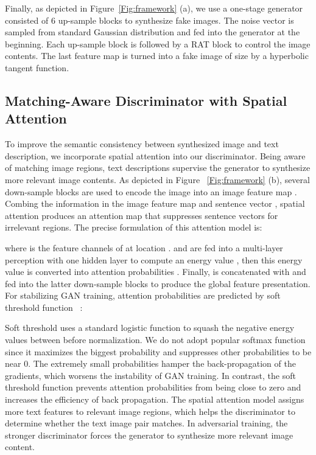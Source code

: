 \documentclass{article}
\begin{document}
Finally, as depicted in Figure~\ref{Fig:framework} (a), we use a one-stage generator consisted of 6 up-sample blocks to synthesize fake images. The noise vector  is sampled from standard Gaussian distribution and fed into the generator at the beginning. Each up-sample block is followed by a RAT block to control the image contents. The last  feature map is turned into a fake image of size  by a hyperbolic tangent function.
	
	\subsection{Matching-Aware Discriminator with Spatial Attention \label{discriminator}}
	To improve the semantic consistency between synthesized image and text description, we incorporate spatial attention into our discriminator.  Being aware of matching image regions, text descriptions supervise the generator to synthesize more relevant image contents.
	As depicted in Figure ~\ref{Fig:framework} (b), several down-sample blocks are used to encode the image into an image feature map . Combing the information in the image feature map  and sentence vector , spatial attention produces an attention map  that suppresses  sentence vectors for irrelevant regions.	The precise formulation of this attention model is:
	
	
	where  is the feature channels of  at location .  and  are fed into a multi-layer perception with one hidden layer to compute an energy value , then this energy value is converted into attention probabilities . Finally,  is concatenated with  and fed into the latter down-sample blocks to produce the global feature presentation.	For stabilizing GAN training, attention probabilities  are predicted by soft threshold function 	~\cite{DBLP:journals/tip/YeHL18}:
		
    Soft threshold uses a standard logistic function to squash the negative energy values between  before normalization.     We do not adopt popular softmax function since it maximizes the biggest probability and suppresses other probabilities to be near 0. The extremely small probabilities hamper the back-propagation of the gradients, which worsens the instability of GAN training. In contrast, the soft threshold function prevents attention probabilities from being close to zero and increases the efficiency of back propagation.
	The spatial attention model assigns more text features to relevant image regions, which helps the discriminator to determine whether the text image pair matches. In adversarial training, the stronger discriminator forces the generator to synthesize more relevant image content.
	
\end{document}
